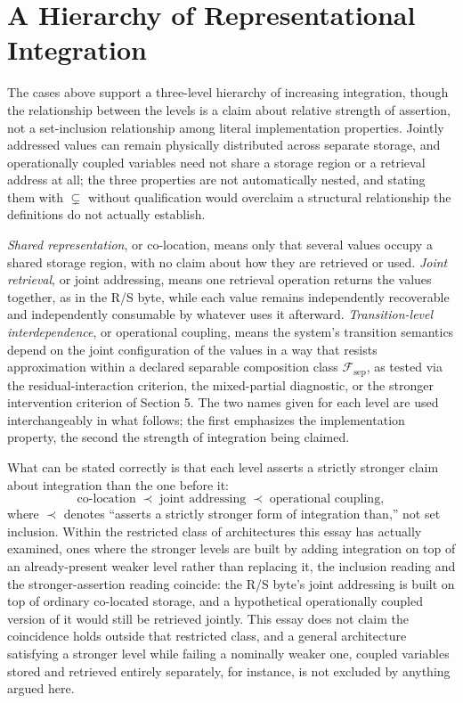 \documentclass[11pt]{article}
\begin{document}
\section{A Hierarchy of Representational Integration}

The cases above support a three-level hierarchy of increasing integration, though the relationship between the levels is a claim about relative strength of assertion, not a set-inclusion relationship among literal implementation properties. Jointly addressed values can remain physically distributed across separate storage, and operationally coupled variables need not share a storage region or a retrieval address at all; the three properties are not automatically nested, and stating them with $\subsetneq$ without qualification would overclaim a structural relationship the definitions do not actually establish.

\emph{Shared representation}, or co-location, means only that several values occupy a shared storage region, with no claim about how they are retrieved or used. \emph{Joint retrieval}, or joint addressing, means one retrieval operation returns the values together, as in the R/S byte, while each value remains independently recoverable and independently consumable by whatever uses it afterward. \emph{Transition-level interdependence}, or operational coupling, means the system's transition semantics depend on the joint configuration of the values in a way that resists approximation within a declared separable composition class $\mathcal{F}_{\mathrm{sep}}$, as tested via the residual-interaction criterion, the mixed-partial diagnostic, or the stronger intervention criterion of Section 5. The two names given for each level are used interchangeably in what follows; the first emphasizes the implementation property, the second the strength of integration being claimed.

What can be stated correctly is that each level asserts a strictly stronger claim about integration than the one before it:
\[
\text{co-location} \;\prec\; \text{joint addressing} \;\prec\; \text{operational coupling},
\]
where $\prec$ denotes ``asserts a strictly stronger form of integration than,'' not set inclusion. Within the restricted class of architectures this essay has actually examined, ones where the stronger levels are built by adding integration on top of an already-present weaker level rather than replacing it, the inclusion reading and the stronger-assertion reading coincide: the R/S byte's joint addressing is built on top of ordinary co-located storage, and a hypothetical operationally coupled version of it would still be retrieved jointly. This essay does not claim the coincidence holds outside that restricted class, and a general architecture satisfying a stronger level while failing a nominally weaker one, coupled variables stored and retrieved entirely separately, for instance, is not excluded by anything argued here.
\end{document}
